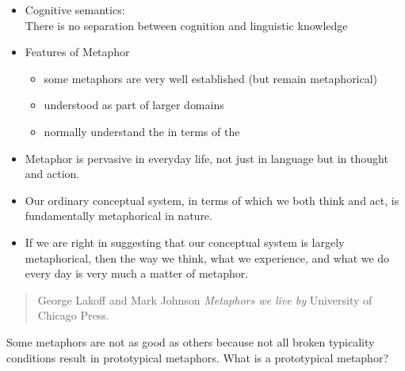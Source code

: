 \documentclass[headrule,footrule]{foils}
\begin{document}
\begin{itemize}
\item Cognitive semantics:
\\ There is no separation between cognition and
linguistic knowledge
\item Features of Metaphor
\begin{itemize}
\item {} some metaphors are very well established (but
  remain metaphorical)
\item {} understood as part of larger domains
\item {} normally understand the  
  in terms of the 
\end{itemize}

\end{itemize}



\begin{itemize}
\item Metaphor is pervasive in everyday life, not just in
language but in thought and action.
\item Our ordinary conceptual system, in terms of which we
both think and act, is fundamentally metaphorical in
nature.
\item If we are right in suggesting that our conceptual system
is largely metaphorical, then the way we think, what we
experience, and what we do every day is very much a
matter of metaphor.
\end{itemize}

\begin{quote}
  George Lakoff and Mark Johnson \citeyear{Lakoff:Johnson:1980} \textit{Metaphors we live by} 
  University of Chicago Press.
\end{quote}




Some metaphors are not as good as others because not all broken typicality
conditions result in prototypical metaphors. What is a prototypical
metaphor?
\end{document}
